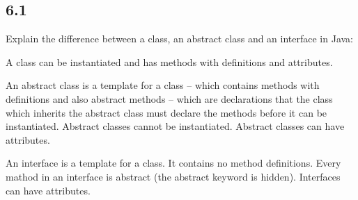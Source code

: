 \documentclass[10pt,\jkfside,a4paper]{article}
\begin{document}
\subsection*{6.1} 
Explain the difference between a class, an abstract class and an interface in Java:

A class can be instantiated and has methods with definitions and attributes. 

An abstract class is a template for a class -- which contains methods with definitions and 
also abstract methods -- which are declarations that the class which inherits the abstract class 
must declare the methods before it can be instantiated. Abstract classes cannot be instantiated.
Abstract classes can have attributes.

An interface is a template for a class. It contains no method definitions. Every mathod in 
an interface is abstract (the abstract keyword is hidden). Interfaces can have attributes.
\end{document}
